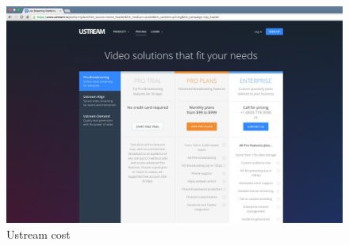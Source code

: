  \begin{figure}[!htb]
 \centering
 \includegraphics[width=1.0\linewidth]{images/chapter3/ustream.png}\hfill
 \caption[Ustream cost]{Ustream cost}
 \label{fig:fourV}
\end{figure}